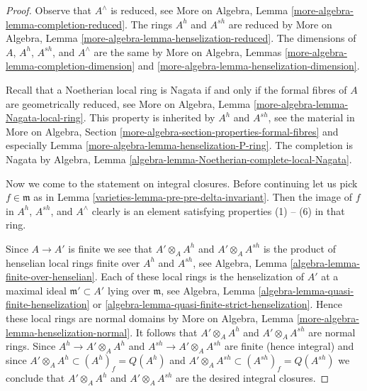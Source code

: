 \begin{proof}

Observe that $A^\wedge$ is reduced, see
More on Algebra, Lemma \ref{more-algebra-lemma-completion-reduced}.
The rings $A^h$ and $A^{sh}$ are reduced by
More on Algebra, Lemma \ref{more-algebra-lemma-henselization-reduced}.
The dimensions of $A$, $A^h$, $A^{sh}$, and $A^\wedge$ are the same
by More on Algebra, Lemmas
\ref{more-algebra-lemma-completion-dimension} and
\ref{more-algebra-lemma-henselization-dimension}.

\medskip\noindent
Recall that a Noetherian local ring is Nagata if and only if the
formal fibres of $A$ are geometrically reduced, see
More on Algebra, Lemma \ref{more-algebra-lemma-Nagata-local-ring}.
This property is inherited by $A^h$ and $A^{sh}$, see
the material in More on Algebra, Section
\ref{more-algebra-section-properties-formal-fibres}
and especially Lemma \ref{more-algebra-lemma-henselization-P-ring}.
The completion is Nagata by
Algebra, Lemma \ref{algebra-lemma-Noetherian-complete-local-Nagata}.

\medskip\noindent
Now we come to the statement on integral closures. Before continuing
let us pick $f \in \mathfrak m$ as in
Lemma \ref{varieties-lemma-pre-pre-delta-invariant}.
Then the image of $f$ in $A^h$, $A^{sh}$, and $A^\wedge$
clearly is an element satisfying properties (1) -- (6)
in that ring.

\medskip\noindent
Since $A \to A'$ is finite we see that
$A' \otimes_A A^h$ and $A' \otimes_A A^{sh}$
is the product of henselian local rings finite over $A^h$ and
$A^{sh}$, see Algebra, Lemma \ref{algebra-lemma-finite-over-henselian}.
Each of these local rings is the henselization of $A'$ at a
maximal ideal $\mathfrak m' \subset A'$ lying over $\mathfrak m$, see
Algebra, Lemma \ref{algebra-lemma-quasi-finite-henselization} or
\ref{algebra-lemma-quasi-finite-strict-henselization}.
Hence these local rings are normal domains by
More on Algebra, Lemma \ref{more-algebra-lemma-henselization-normal}.
It follows that $A' \otimes_A A^h$ and $A' \otimes_A A^{sh}$
are normal rings. Since $A^h \to A' \otimes_A A^h$ and
$A^{sh} \to A' \otimes_A A^{sh}$ are finite (hence integral) and since
$A' \otimes_A A^h \subset (A^h)_f = Q(A^h)$ and
$A' \otimes_A A^{sh} \subset (A^{sh})_f = Q(A^{sh})$
we conclude that $A' \otimes_A A^h$ and $A' \otimes_A A^{sh}$ are
the desired integral closures.


\end{proof}
